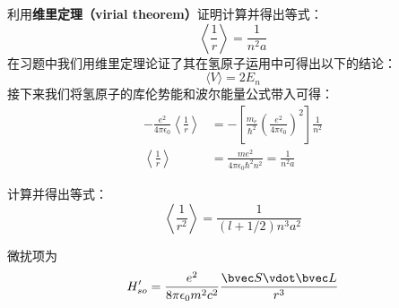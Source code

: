 \begin{exercise}{}\label{HfineS_exe1}
利用\textbf{维里定理（virial theorem）}证明计算并得出等式：
\begin{equation}
\left\langle\frac{1}{r}\right\rangle = \frac{1}{n^2a}
\end{equation}
在习题中我们用维里定理论证了其在氢原子运用中可得出以下的结论：
\begin{equation}
\langle V\rangle =2E_n
\end{equation}
接下来我们将氢原子的库伦势能和波尔能量公式带入可得：
\begin{align}
-\frac{e^2}{4\pi\epsilon_0}\left\langle \frac{1}{r}\right\rangle&=-\left[\frac {m_e}{\hbar^{2}} \left(\frac {e^ {2}}{4\pi \epsilon_0}\right)^ {2}\right]  \frac {1}{n^ {2}}\\
\left\langle \frac{1}{r}\right\rangle&=\frac{me^2}{4\pi\epsilon_0\hbar^2n^2}=\frac{1}{n^2a}
\end{align}

\end{exercise}
\begin{exercise}{}\label{HfineS_exe2}
计算并得出等式：
\begin{equation}
\left\langle \frac{1}{r^2}\right\rangle = \frac{1}{(l+1/2)n^3a^2}
\end{equation}
\end{exercise}
微扰项为
\begin{equation}
H'_{so} = \frac{e^2}{8\pi \epsilon_0 m^2 c^2} \frac{\bvec S \vdot \bvec L}{r^3}
\end{equation}
